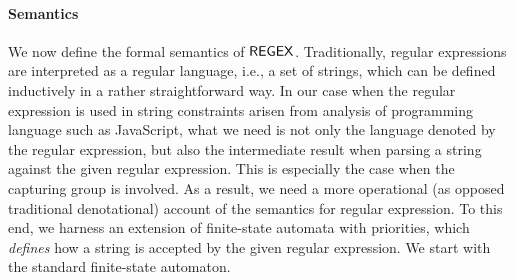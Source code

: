 


%
%

\paragraph{Semantics}
We now define the formal semantics of ${\sf REGEX}$. Traditionally, regular expressions are interpreted as a regular language, i.e., a set of strings, which can be defined inductively in a rather straightforward way. In our case when the regular expression is used in string constraints arisen from analysis of programming language such as JavaScript, %
what we need is not only the language denoted by the regular expression, but also the intermediate result when parsing a string against the given regular expression. This is especially the case when the capturing group is involved. As a result, we need a more operational (as opposed traditional denotational) account of the semantics for regular expression. To this end, we harness an extension of finite-state automata with priorities, which \emph{defines} how a string is accepted by the given regular expression. We start with the standard finite-state automaton.  


%
% 

